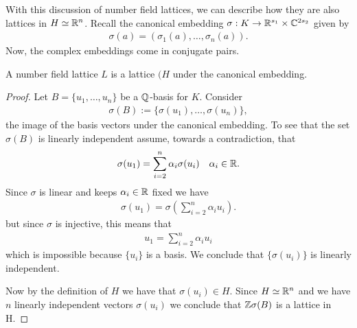     With this discussion of number field lattices, we can describe how they are also lattices in \(H\simeq\mathbb{R}^n\). Recall the canonical embedding \(\sigma:K\rightarrow\mathbb{R}^{s_1}\times\mathbb{C}^{2s_2}\) given by
    \begin{align*}
        \sigma(a) = (\sigma_1(a), \dots , \sigma_n(a)).
    \end{align*}
    Now, the complex embeddings come in conjugate pairs.

    \begin{proposition}
        A number field lattice \(L\) is a lattice \((H\) under the canonical embedding.
    \end{proposition}
    \begin{proof}
        Let \(B = \{u_1,\dots ,u_n\}\) be a \(\mathbb{Q}\)-basis for \(K\). Consider
        \begin{align*}
            \sigma(B) := \{\sigma(u_1),\dots ,\sigma(u_n)\},
        \end{align*}
        the image of the basis vectors under the canonical embedding. To see that the set \(\sigma(B)\) is linearly independent assume, towards a contradiction, that 
        \begin{align*}
            \sigma(u_1) = \sum\limits_{i = 2}^n\alpha_i \sigma(u_i)\quad\alpha_i\in\mathbb{R}.
        \end{align*}
        Since \(\sigma\) is linear and keeps \(\alpha_i\in\mathbb{R}\) fixed we have
        \begin{align*}
            \sigma(u_1) = \sigma\left(\sum\limits_{i = 2}^n \alpha_i u_i \right).
        \end{align*}
        but since \(\sigma\) is injective, this means that
        \begin{align*}
            u_1 = \sum\limits_{i = 2}^n\alpha_i u_i
        \end{align*}
        which is impossible because \(\{u_i\}\) is a basis. We conclude that \(\{\sigma(u_i)\}\) is linearly independent. \par
        Now by the definition of \(H\) we have that \(\sigma(u_i)\in H\). Since \(H\simeq\mathbb{R}^n\) and we have \(n\) linearly independent vectors \(\sigma(u_i)\) we conclude that \(\mathbb{Z}\sigma(B)\) is a lattice in H.
    \end{proof}

